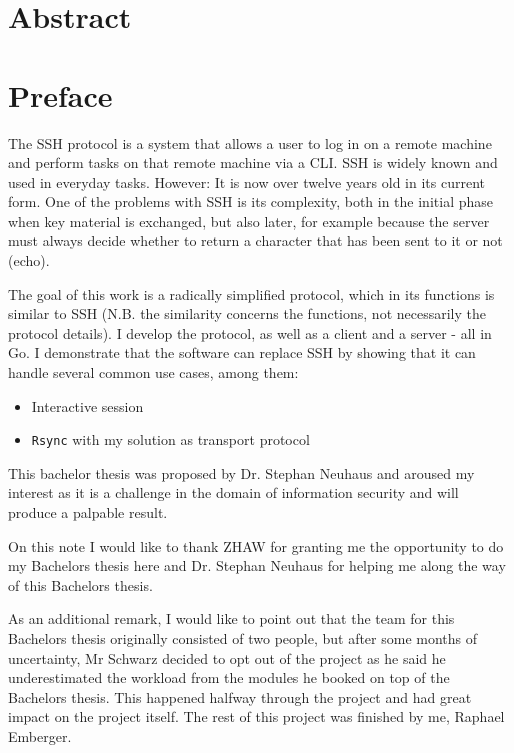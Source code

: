 \documentclass[10pt,a4paper,titlepage,twoside,english,final]{zhawreprt}
\begin{document}
\maketitle

\chapter*{Abstract}\label{sec:Abstract}


\chapter*{Preface}\label{sec:Preface}
The \gls{SSH} protocol \citep{rfc253,rfc6668,rfc8268,rfc8308,rfc8332} is a system that allows a user to log in on a remote machine and perform tasks on that remote machine via a \gls{CLI}. \gls{SSH} is widely known and used in everyday tasks. However: It is now over twelve years old in its current form. One of the problems with \gls{SSH} is its complexity, both in the initial phase when key material is exchanged, but also later, for example because the server must always decide whether to return a character that has been sent to it or not (echo).

The goal of this work is a radically simplified protocol, which in its functions is similar to \gls{SSH} (N.B. the similarity concerns the functions, not necessarily the protocol details). I develop the protocol, as well as a client and a server - all in \gls{Go}. I demonstrate that the software can replace \gls{SSH} by showing that it can handle several common use cases, among them:

\begin{itemize}
\item Interactive session
\item \texttt{Rsync} with my solution as transport protocol
\end{itemize}

This bachelor thesis was proposed by Dr. Stephan Neuhaus \citep{BA19_neut_03} and aroused my interest as it is a challenge in the domain of information security and will produce a palpable result.

On this note I would like to thank \gls{ZHAW} for granting me the opportunity to do my Bachelors thesis here and Dr. Stephan Neuhaus for helping me along the way of this Bachelors thesis.

As an additional remark, I would like to point out that the team for this Bachelors thesis originally consisted of two people, but after some months of uncertainty, Mr Schwarz decided to opt out of the project as he said he underestimated the workload from the modules he booked on top of the Bachelors thesis. This happened halfway through the project and had great impact on the project itself. The rest of this project was finished by me, Raphael Emberger.
\end{document}

